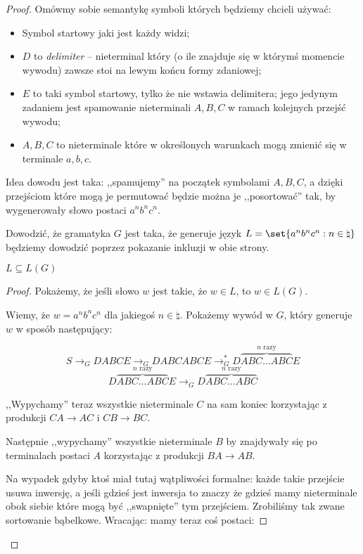 \begin{proof}
	Omówmy sobie semantykę symboli których będziemy chcieli używać:

	\begin{itemize}
		\item Symbol startowy jaki jest każdy widzi;
		\item \(D\) to \textit{delimiter} -- nieterminal który (o ile znajduje się w którymś momencie wywodu) zawsze stoi na lewym końcu formy zdaniowej;
		\item \(E\) to taki symbol startowy, tylko że nie wstawia delimitera; jego jedynym zadaniem jest spamowanie nieterminali \(A, B, C\) w ramach kolejnych przejść wywodu;
		\item \(A, B, C\) to nieterminale które w określonych warunkach mogą zmienić się w terminale \(a, b, c\).
	\end{itemize}

	Idea dowodu jest taka: ,,spamujemy'' na początek symbolami \(A, B, C\), a dzięki przejściom które mogą je permutować będzie można je ,,posortować'' tak, by wygenerowały słowo postaci \(a^nb^nc^n\).

	Dowodzić, że gramatyka \(G\) jest taka, że generuje język \(L = \set{a^nb^nc^n : n \in \natural}\) będziemy dowodzić poprzez pokazanie inkluzji w obie strony.


	\begin{lemma}
		\(L \subseteq L(G)\)
	\end{lemma}
	\begin{proof}
		Pokażemy, że jeśli słowo \(w\) jest takie, że \(w \in L\), to \(w \in L(G)\).

		Wiemy, że \(w = a^nb^nc^n\) dla jakiegoś \(n \in \natural\). Pokażemy wywód w \(G\), który generuje \(w\) w sposób następujący:

		\[
			S \rightarrow_G DABCE \rightarrow_G DABCABCE \rightarrow^*_G D \overbrace{ABC \dots ABC}^{\text{\(n\) razy}}E
		\]
		\[
			D \overbrace{ABC \dots ABC}^{\text{\(n\) razy}}E \rightarrow_G D \overbrace{ABC \dots ABC}^{\text{\(n\) razy}}
		\]

		,,Wypychamy'' teraz wszystkie nieterminale \(C\) na sam koniec korzystając z produkcji \(CA \rightarrow AC\) i \(CB \rightarrow BC\).

		Następnie ,,wypychamy'' wszystkie nieterminale \(B\) by znajdywały się po terminalach postaci \(A\) korzystając z produkcji \(BA \rightarrow AB\).

		Na wypadek gdyby ktoś miał tutaj wątpliwości formalne: każde takie przejście usuwa inwersję, a jeśli gdzieś jest inwersja to znaczy że gdzieś mamy nieterminale obok siebie które mogą być ,,swapnięte'' tym przejściem. Zrobiliśmy tak zwane sortowanie bąbelkowe.
		Wracając: mamy teraz coś postaci:


\end{proof}
\end{proof}
